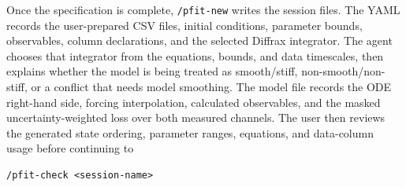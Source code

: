 Once the specification is complete, \texttt{/pfit-new} writes the session files.
The YAML records the user-prepared CSV files, initial conditions, parameter
bounds, observables, column declarations, and the selected Diffrax integrator.
The agent chooses that integrator from the equations, bounds, and data
timescales, then explains whether the model is being treated as smooth/stiff,
non-smooth/non-stiff, or a conflict that needs model smoothing. The model file
records the ODE right-hand side, forcing interpolation, calculated observables,
and the masked uncertainty-weighted loss over both measured channels. The user then reviews the generated state ordering,
parameter ranges, equations, and data-column usage before continuing to

\begin{verbatim}
/pfit-check <session-name>
\end{verbatim}
